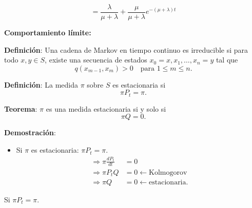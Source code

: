 \documentclass[12pt,a4paper]{article}
\newcommand{\definicion}[1]{%
\begin{definicionbox}
\textbf{Definición}: #1
\end{definicionbox}
}
\newcommand{\teorema}[1]{%
\begin{teoremabox}
\textbf{Teorema}: #1
\end{teoremabox}
}
\begin{document}
\begin{equation*}
= \frac{\lambda}{\mu+\lambda} + \frac{\mu}{\mu+\lambda} e^{-(\mu+\lambda)t}
\end{equation*}


\textbf{Comportamiento límite:}

\definicion{Una cadena de Markov en tiempo continuo es irreducible si para todo $x, y \in S$, existe una secuencia de estados $x_0 = x, x_1, \ldots, x_n = y$ tal que
\begin{equation*}
q(x_{m-1}, x_m) > 0 \quad \text{para } 1 \leq m \leq n.
\end{equation*}}

\begin{center}
\end{center}

\definicion{La medida $\pi$ sobre $S$ es estacionaria si
\begin{equation*}
\pi P_t = \pi.
\end{equation*}
}


\teorema{$\pi$ es una medida estacionaria si y solo si
\begin{equation*}
\pi Q = 0.
\end{equation*}
}

\textbf{Demostración}:

\begin{itemize}
\item Si $\pi$ es estacionaria: $\pi P_t = \pi$.
\begin{align*}
\Rightarrow \pi \frac{dP_t}{dt} &= 0 \\
\Rightarrow \pi P_t Q &= 0 \leftarrow \text{Kolmogorov} \\
\Rightarrow \pi Q &= 0 \leftarrow \text{estacionaria}.
\end{align*}
\end{itemize}

Si $\pi P_t = \pi$.
\end{document}
